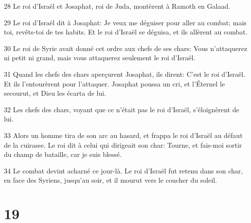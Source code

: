 \par 28 Le roi d'Israël et Josaphat, roi de Juda, montèrent à Ramoth en Galaad.
\par 29 Le roi d'Israël dit à Josaphat: Je veux me déguiser pour aller au combat; mais toi, revêts-toi de tes habits. Et le roi d'Israël se déguisa, et ils allèrent au combat.
\par 30 Le roi de Syrie avait donné cet ordre aux chefs de ses chars: Vous n'attaquerez ni petit ni grand, mais vous attaquerez seulement le roi d'Israël.
\par 31 Quand les chefs des chars aperçurent Josaphat, ils dirent: C'est le roi d'Israël. Et ils l'entourèrent pour l'attaquer. Josaphat poussa un cri, et l'Éternel le secourut, et Dieu les écarta de lui.
\par 32 Les chefs des chars, voyant que ce n'était pas le roi d'Israël, s'éloignèrent de lui.
\par 33 Alors un homme tira de son arc au hasard, et frappa le roi d'Israël au défaut de la cuirasse. Le roi dit à celui qui dirigeait son char: Tourne, et fais-moi sortir du champ de bataille, car je suis blessé.
\par 34 Le combat devint acharné ce jour-là. Le roi d'Israël fut retenu dans son char, en face des Syriens, jusqu'au soir, et il mourut vers le coucher du soleil.

\chapter{19}

